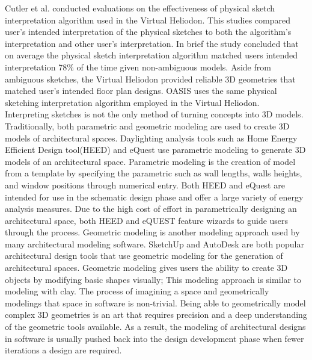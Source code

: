 	Cutler et al. conducted evaluations on the effectiveness of physical sketch interpretation algorithm used in the Virtual Heliodon\cite{cutler2009inferring}.
	This studies compared user's intended interpretation of the physical sketches to both the algorithm's interpretation and other user's interpretation.
	In brief the study concluded that on average the physical sketch interpretation algorithm matched users intended interpretation 78\% of the time given non-ambiguous models\cite{cutler2009inferring}.
	Aside from ambiguous sketches, the Virtual Heliodon provided reliable 3D geometries that matched user's intended floor plan designs.
	OASIS uses the same physical sketching interpretation algorithm employed in the Virtual Heliodon.\\

	Interpreting sketches is not the only method of turning concepts into 3D models.
	Traditionally, both parametric and geometric modeling are used to create 3D models of architectural spaces.
	Daylighting analysis tools such as Home Energy Efficient Design tool(HEED) and eQuest use parametric modeling to generate 3D models of an architectural space\cite{hirsch2010equest,milne2001drag}.
	Parametric modeling is the creation of model from a template by specifying the parametric such as wall lengths, walls heights, and window positions through numerical entry.
	Both HEED and eQuest are intended for use in the schematic design phase and offer a large variety of energy analysis measures.
	Due to the high cost of effort in parametrically designing an architectural space, both HEED and eQUEST feature wizards to guide users through the process. 
	Geometric modeling is another modeling approach used by many architectural modeling software.
	SketchUp and AutoDesk are both popular architectural design tools that use geometric modeling for the generation of architectural spaces. 
	Geometric modeling gives users the ability to create 3D objects by modifying basic shapes visually; This modeling approach is similar to modeling with clay.
	The process of imagining a space and geometrically modelings that space in software is non-trivial.
	Being able to geometrically model complex 3D geometries is an art that requires precision and a deep understanding of the geometric tools available.
	As a result, the modeling of architectural designs in software is usually pushed back into the design development phase when fewer iterations a design are required\cite{Galasiu}.\\

